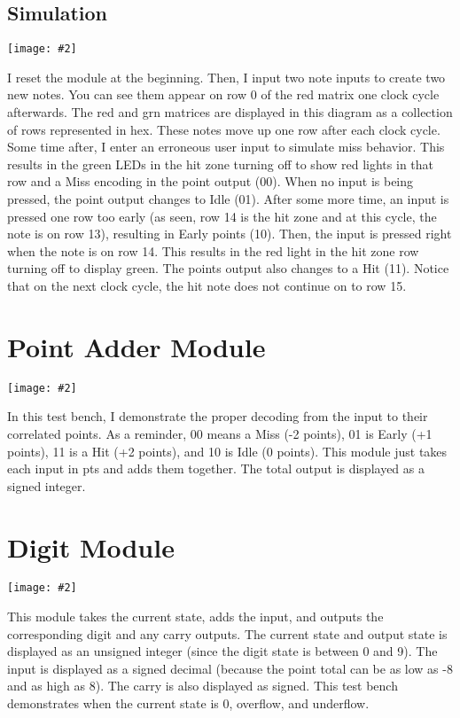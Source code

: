 \documentclass{article}
\newenvironment{solution}{\begin{mdframed}[style=SolutionFrame]}{\end{mdframed}}
\newcommand{\img}[2][1.0]{
    \begin{minipage}[t]{\linewidth}
        \begin{center}
            \texttt{[image: \#2]}
        \end{center}
    \end{minipage}
}
\begin{document}
\subsection{Simulation}
    \begin{solution}
        \img{track_waves.png}
        I reset the module at the beginning. Then, I input two note inputs to create two new notes. You can see them appear on row 0 of the red matrix one clock cycle afterwards. The red and grn matrices are displayed in this diagram as a collection of rows represented in hex. These notes move up one row after each clock cycle. Some time after, I enter an erroneous user input to simulate miss behavior. This results in the green LEDs in the hit zone turning off to show red lights in that row and a Miss encoding in the point output (00). When no input is being pressed, the point output changes to Idle (01). After some more time, an input is pressed one row too early (as seen, row 14 is the hit zone and at this cycle, the note is on row 13), resulting in Early points (10). Then, the input is pressed right when the note is on row 14. This results in the red light in the hit zone row turning off to display green. The points output also changes to a Hit (11). Notice that on the next clock cycle, the hit note does not continue on to row 15.
    \end{solution}

\newpage
\section{Point Adder Module}
    \begin{solution}
        \img{point_adder_waves.png}
        In this test bench, I demonstrate the proper decoding from the input to their correlated points. As a reminder, 00 means a Miss (-2 points), 01 is Early (+1 points), 11 is a Hit (+2 points), and 10 is Idle (0 points). This module just takes each input in pts and adds them together. The total output is displayed as a signed integer.
    \end{solution}

\section{Digit Module}
    \begin{solution}
        \img{digit_waves.png}
        This module takes the current state, adds the input, and outputs the corresponding digit and any carry outputs. The current state and output state is displayed as an unsigned integer (since the digit state is between 0 and 9). The input is displayed as a signed decimal (because the point total can be as low as -8 and as high as 8). The carry is also displayed as signed. This test bench demonstrates when the current state is 0, overflow, and underflow.
    \end{solution}
\end{document}
